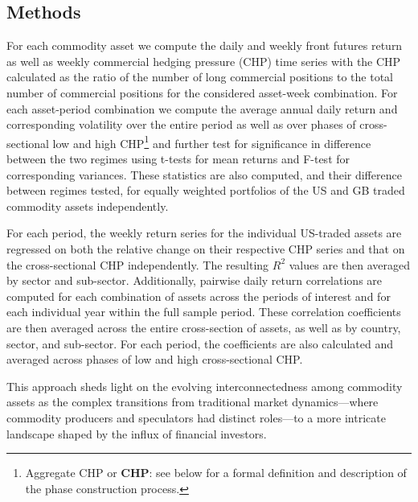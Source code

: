 \documentclass[
  authoryear,
  preprint,
  3p]{elsarticle}
\begin{document}
\subsection{Methods}\label{sec-methods}

For each commodity asset we compute the daily and weekly front futures
return as well as weekly commercial hedging pressure (CHP) time series
with the CHP calculated as the ratio of the number of long commercial
positions to the total number of commercial positions for the considered
asset-week combination. For each asset-period combination we compute the
average annual daily return and corresponding volatility over the entire
period as well as over phases of cross-sectional low and high
CHP\footnote{Aggregate CHP or \textbf{CHP}: see below for a formal
  definition and description of the phase construction process.} and
further test for significance in difference between the two regimes
using t-tests for mean returns and F-test for corresponding variances.
These statistics are also computed, and their difference between regimes
tested, for equally weighted portfolios of the US and GB traded
commodity assets independently.

For each period, the weekly return series for the individual US-traded
assets are regressed on both the relative change on their respective CHP
series and that on the cross-sectional CHP independently. The resulting
\(R^{2}\) values are then averaged by sector and sub-sector.
Additionally, pairwise daily return correlations are computed for each
combination of assets across the periods of interest and for each
individual year within the full sample period. These correlation
coefficients are then averaged across the entire cross-section of
assets, as well as by country, sector, and sub-sector. For each period,
the coefficients are also calculated and averaged across phases of low
and high cross-sectional CHP.

This approach sheds light on the evolving interconnectedness among
commodity assets as the complex transitions from traditional market
dynamics---where commodity producers and speculators had distinct
roles---to a more intricate landscape shaped by the influx of financial
investors.

\bigskip
\bigskip
\end{document}
